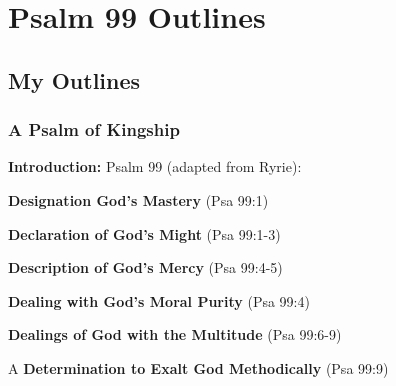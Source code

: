 \section{Psalm 99 Outlines}

\subsection{My Outlines}

\subsubsection{A Psalm of Kingship}
\textbf{Introduction: }Psalm 99 (adapted from Ryrie):

\begin{compactenum}[I.]
    \item \textbf{Designation God's Mastery} (Psa 99:1)
    \item \textbf{Declaration of God's Might} (Psa 99:1-3)
    \item \textbf{Description of God's Mercy} (Psa 99:4-5)
    \item \textbf{Dealing with God's Moral Purity} (Psa 99:4)
    \item \textbf{Dealings of God with the Multitude} (Psa 99:6-9)
    \item A \textbf{Determination to Exalt God Methodically} (Psa 99:9)
\end{compactenum}
